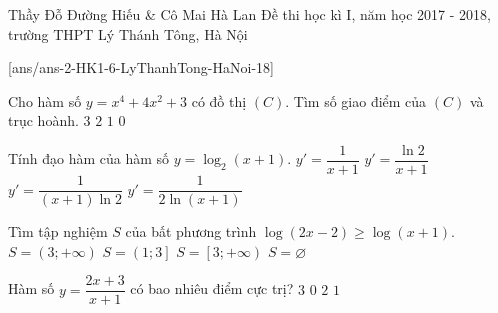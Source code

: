 \begin{name}
{Thầy Đỗ Đường Hiếu \& Cô Mai Hà Lan}
{Đề thi học kì I, năm học 2017 - 2018, trường THPT Lý Thánh Tông, Hà Nội}
\end{name}
\setcounter{ex}{0}\setcounter{bt}{0}
[ans/ans-2-HK1-6-LyThanhTong-HaNoi-18]

\begin{ex}%
Cho hàm số $y=x^{4}+4x^{2}+3$ có đồ thị $\left(C\right)$. Tìm số giao điểm của $\left(C\right)$ và trục hoành.
\choice
{$3$}
{$2$}
{$1$}
{\True $0$}
\end{ex}

\begin{ex}%
Tính đạo hàm của hàm số $y=\log_{2}\left(x+1\right)$.
\choice
{$y'=\dfrac{1}{x+1}$}
{$y'=\dfrac{\ln{2}}{x+1}$}
{\True $y'=\dfrac{1}{\left(x+1\right)\ln{2}}$}
{$y'=\dfrac{1}{2\ln\left(x+1\right)}$}
\end{ex}


\begin{ex}%
Tìm tập nghiệm $S$ của bất phương trình $\log\left(2x-2\right)\ge \log\left(x+1\right)$.
\choice
{$S=\left(3;+\infty \right)$}
{$S=\left(1;3\right]$}
{\True $S=\left[3;+\infty\right)$}
{$S=\varnothing$}
\loigiai{
Ta có  $\log\left(2x-2\right)\ge \log\left(x+1\right)\Leftrightarrow \heva{&2x-2 \ge x+1\\&2x-2>0\\&x+1>0}$
 $\Leftrightarrow x \ge 3$.\\
Vậy, tập nghiệm $S$ của bất phương trình là:  $S=\left[3;+\infty \right)$.
}
\end{ex}

\begin{ex}%
Hàm số $y=\dfrac{2x+3}{x+1}$ có bao nhiêu điểm cực trị?
\choice
{$3$}
{\True $0$}
{$2$}
{$1$}
\end{ex}

